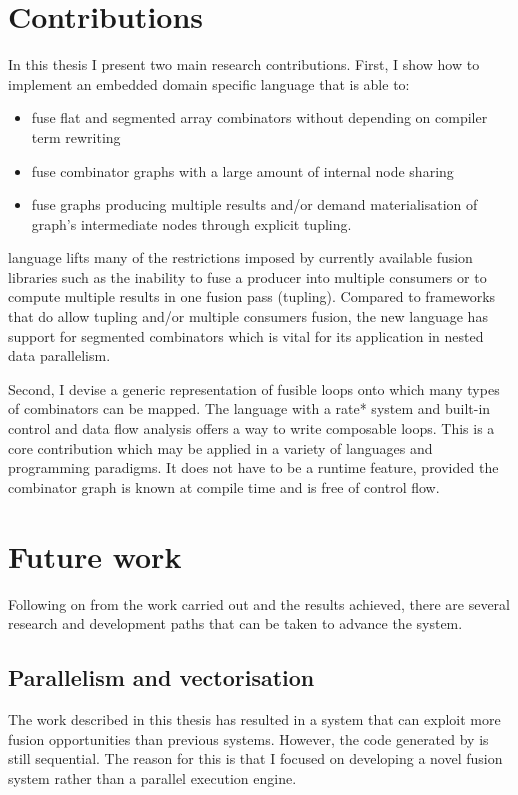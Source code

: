 \documentclass[preamble.tex]{subfiles}
\begin{document}
\section{Contributions}

In this thesis I present two main research contributions. First, I show how to implement an embedded domain specific language that is able to:
\begin{itemize}
\item fuse flat and segmented array combinators without depending on compiler term rewriting
\item fuse combinator graphs with a large amount of internal node sharing
\item fuse graphs producing multiple results and/or demand materialisation of graph's intermediate nodes through explicit tupling.
\end{itemize}

\LiveFusion language lifts many of the restrictions imposed by currently available fusion libraries such as the inability to fuse a producer into multiple consumers or to compute multiple results in one fusion pass (tupling). Compared to frameworks that do allow tupling and/or multiple consumers fusion, the new language has support for segmented combinators which is vital for its application in nested data parallelism.

Second, I devise a generic representation of fusible loops onto which many types of combinators can be mapped. The \Loop language with a \*rate* system and built-in control and data flow analysis offers a way to write composable loops. This is a core contribution which may be applied in a variety of languages and programming paradigms. It does not have to be a runtime feature, provided the combinator graph is known at compile time and is free of control flow.


\section{Future work}

Following on from the work carried out and the results achieved, there are several research and development paths that can be taken to advance the \LiveFusion system.

\subsection{Parallelism and vectorisation}

The work described in this thesis has resulted in a system that can exploit more fusion opportunities than previous systems. However, the code generated by \LiveFusion is still sequential. The reason for this is that I focused on developing a novel fusion system rather than a parallel execution engine.
\end{document}
